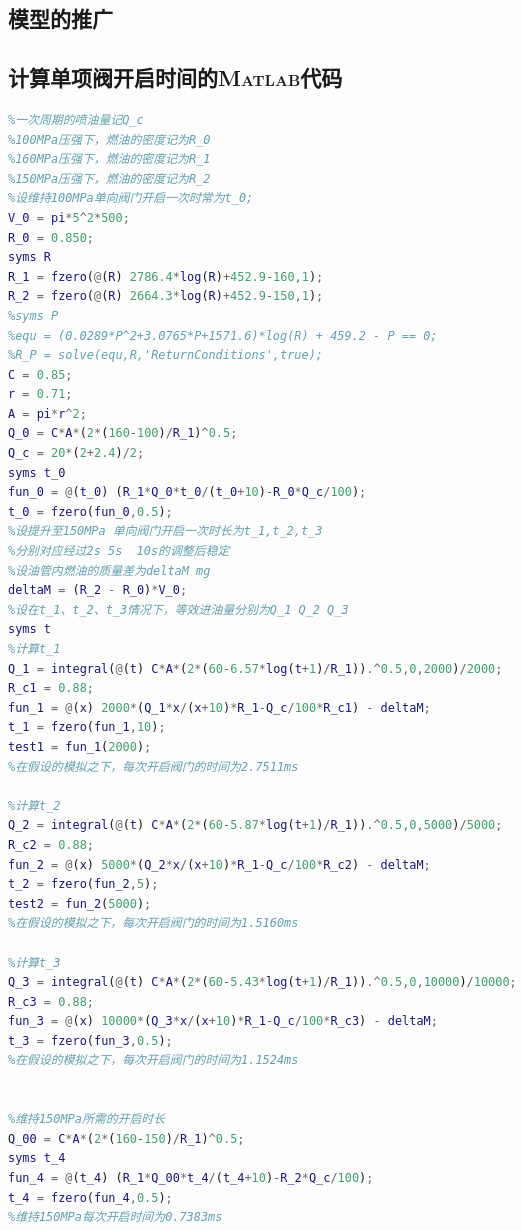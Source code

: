 \documentclass{cumcmthesis}
\begin{document}
\subsection{模型的推广}

\begin{thebibliography}{9}%
\end{thebibliography}
\newpage
\begin{appendices}
\section{计算单项阀开启时间的\textsc{Matlab}代码}
\begin{lstlisting}[language=matlab]
%高压油管的容积为V_0
%一次周期的喷油量记Q_c
%100MPa压强下，燃油的密度记为R_0
%160MPa压强下，燃油的密度记为R_1
%150MPa压强下，燃油的密度记为R_2
%设维持100MPa单向阀门开启一次时常为t_0;
V_0 = pi*5^2*500;
R_0 = 0.850;
syms R
R_1 = fzero(@(R) 2786.4*log(R)+452.9-160,1);
R_2 = fzero(@(R) 2664.3*log(R)+452.9-150,1);
%syms P
%equ = (0.0289*P^2+3.0765*P+1571.6)*log(R) + 459.2 - P == 0;
%R_P = solve(equ,R,'ReturnConditions',true);
C = 0.85;
r = 0.71;
A = pi*r^2;
Q_0 = C*A*(2*(160-100)/R_1)^0.5;
Q_c = 20*(2+2.4)/2;
syms t_0
fun_0 = @(t_0) (R_1*Q_0*t_0/(t_0+10)-R_0*Q_c/100);
t_0 = fzero(fun_0,0.5);
%设提升至150MPa 单向阀门开启一次时长为t_1,t_2,t_3
%分别对应经过2s 5s  10s的调整后稳定
%设油管内燃油的质量差为deltaM mg
deltaM = (R_2 - R_0)*V_0;
%设在t_1、t_2、t_3情况下，等效进油量分别为Q_1 Q_2 Q_3
syms t
%计算t_1
Q_1 = integral(@(t) C*A*(2*(60-6.57*log(t+1)/R_1)).^0.5,0,2000)/2000;
R_c1 = 0.88;
fun_1 = @(x) 2000*(Q_1*x/(x+10)*R_1-Q_c/100*R_c1) - deltaM;
t_1 = fzero(fun_1,10);
test1 = fun_1(2000);
%在假设的模拟之下，每次开启阀门的时间为2.7511ms

%计算t_2
Q_2 = integral(@(t) C*A*(2*(60-5.87*log(t+1)/R_1)).^0.5,0,5000)/5000;
R_c2 = 0.88;
fun_2 = @(x) 5000*(Q_2*x/(x+10)*R_1-Q_c/100*R_c2) - deltaM;
t_2 = fzero(fun_2,5);
test2 = fun_2(5000);
%在假设的模拟之下，每次开启阀门的时间为1.5160ms

%计算t_3
Q_3 = integral(@(t) C*A*(2*(60-5.43*log(t+1)/R_1)).^0.5,0,10000)/10000;
R_c3 = 0.88;
fun_3 = @(x) 10000*(Q_3*x/(x+10)*R_1-Q_c/100*R_c3) - deltaM;
t_3 = fzero(fun_3,0.5);
%在假设的模拟之下，每次开启阀门的时间为1.1524ms


%维持150MPa所需的开启时长
Q_00 = C*A*(2*(160-150)/R_1)^0.5;
syms t_4
fun_4 = @(t_4) (R_1*Q_00*t_4/(t_4+10)-R_2*Q_c/100);
t_4 = fzero(fun_4,0.5);
%维持150MPa每次开启时间为0.7383ms
\end{lstlisting}

\end{appendices}
\end{document}
